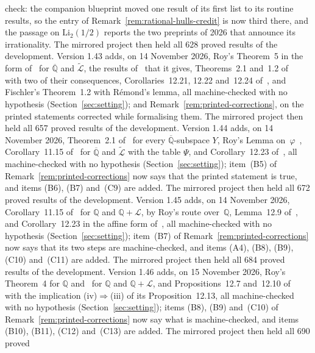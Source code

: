 \documentclass[11pt,a4paper]{article}
\theoremstyle{plain}
\theoremstyle{definition}
\newcommand{\Q}{\mathbb{Q}}
\newcommand{\Alg}{\overline{\mathbb{Q}}}
\newcommand{\Logs}{\mathcal{L}}
\newcommand{\aLogs}{\widetilde{\mathcal{L}}}
\begin{document}
check: the companion blueprint moved one result of its first list to its routine results, so the entry of
Remark~\ref{rem:rational-hulls-credit} is now third there, and the passage on $\mathrm{Li}_{2}(1/2)$ reports
the two preprints of 2026 that announce its irrationality. The mirrored project then held all 628 proved results
of the development.
Version 1.43 adds, on 14 November 2026, Roy's Theorem~5 in the form of~\cite[Corollary~11.15]{waldschmidt-book}
for $\Alg$ and $\aLogs$, the results of~\cite{waldschmidt-2005a} that it gives, Theorems~2.1 and~1.2
of~\cite{waldschmidt-2005b} with two of their consequences, Corollaries~12.21, 12.22 and~12.24
of~\cite{waldschmidt-book}, and Fischler's Theorem~1.2 with R\'emond's lemma, all machine-checked with no
hypothesis (Section~\ref{sec:setting}); and Remark~\ref{rem:printed-corrections}, on the printed statements
corrected while formalising them. The mirrored project then held all 657 proved results of the development.
Version 1.44 adds, on 14 November 2026, Theorem~2.1 of~\cite{waldschmidt-2005b} for every $\Alg$-subspace $Y$,
Roy's Lemma on~$\varphi$~\cite[p.~40]{roy-1992}, Corollary~11.15 of~\cite{waldschmidt-book} for $\Alg$ and $\aLogs$
with the table $\Psi$, and Corollary~12.23 of~\cite{waldschmidt-book}, all machine-checked with no hypothesis
(Section~\ref{sec:setting}); item~(B5) of Remark~\ref{rem:printed-corrections} now says that the printed statement
is true, and items (B6), (B7) and~(C9) are added. The mirrored project then held all 672 proved results of the
development.
Version 1.45 adds, on 14 November 2026, Corollary~11.15 of~\cite{waldschmidt-book} for $\Q$ and $\Q+\Logs$, by
Roy's route over~$\Q$, Lemma~12.9 of~\cite{waldschmidt-book}, and Corollary~12.23 in the affine form
of~\cite[p.~435]{waldschmidt-book}, all machine-checked with no hypothesis (Section~\ref{sec:setting}); item~(B7) of
Remark~\ref{rem:printed-corrections} now says that its two steps are machine-checked, and items (A4), (B8), (B9),
(C10) and~(C11) are added. The mirrored project then held all 684 proved results of the development.
Version 1.46 adds, on 15 November 2026, Roy's Theorem~4 for $\Q$ and~\cite[Proposition~11.19]{waldschmidt-book}
for $\Q$ and $\Q+\Logs$, and Propositions~12.7 and~12.10 of~\cite{waldschmidt-book} with the implication
(iv)$\Rightarrow$(iii) of its Proposition~12.13, all machine-checked with no hypothesis
(Section~\ref{sec:setting}); items (B8), (B9) and~(C10) of Remark~\ref{rem:printed-corrections} now say what is
machine-checked, and items (B10), (B11), (C12) and~(C13) are added. The mirrored project then held all 690 proved
\end{document}
